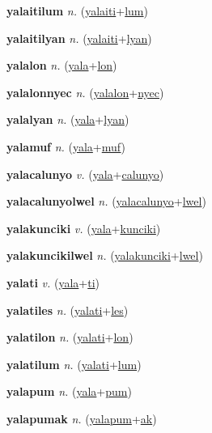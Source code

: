 \textbf{\hypertarget{yalaitilum}{yalaitilum}} \textit{n.} (\hyperlink{yalaiti}{yalaiti}+\allowbreak \hyperlink{lum}{lum})


\textbf{\hypertarget{yalaitilyan}{yalaitilyan}} \textit{n.} (\hyperlink{yalaiti}{yalaiti}+\allowbreak \hyperlink{lyan}{lyan})


\textbf{\hypertarget{yalalon}{yalalon}} \textit{n.} (\hyperlink{yala}{yala}+\allowbreak \hyperlink{lon}{lon})


\textbf{\hypertarget{yalalonnyec}{yalalonnyec}} \textit{n.} (\hyperlink{yalalon}{yalalon}+\allowbreak \hyperlink{nyec}{nyec})


\textbf{\hypertarget{yalalyan}{yalalyan}} \textit{n.} (\hyperlink{yala}{yala}+\allowbreak \hyperlink{lyan}{lyan})


\textbf{\hypertarget{yalamuf}{yalamuf}} \textit{n.} (\hyperlink{yala}{yala}+\allowbreak \hyperlink{muf}{muf})


\textbf{\hypertarget{yalacalunyo}{yalacalunyo}} \textit{v.} (\hyperlink{yala}{yala}+\allowbreak \hyperlink{calunyo}{calunyo})


\textbf{\hypertarget{yalacalunyolwel}{yalacalunyolwel}} \textit{n.} (\hyperlink{yalacalunyo}{yalacalunyo}+\allowbreak \hyperlink{lwel}{lwel})


\textbf{\hypertarget{yalakunciki}{yalakunciki}} \textit{v.} (\hyperlink{yala}{yala}+\allowbreak \hyperlink{kunciki}{kunciki})


\textbf{\hypertarget{yalakuncikilwel}{yalakuncikilwel}} \textit{n.} (\hyperlink{yalakunciki}{yalakunciki}+\allowbreak \hyperlink{lwel}{lwel})


\textbf{\hypertarget{yalati}{yalati}} \textit{v.} (\hyperlink{yala}{yala}+\allowbreak \hyperlink{ti}{ti})


\textbf{\hypertarget{yalatiles}{yalatiles}} \textit{n.} (\hyperlink{yalati}{yalati}+\allowbreak \hyperlink{les}{les})


\textbf{\hypertarget{yalatilon}{yalatilon}} \textit{n.} (\hyperlink{yalati}{yalati}+\allowbreak \hyperlink{lon}{lon})


\textbf{\hypertarget{yalatilum}{yalatilum}} \textit{n.} (\hyperlink{yalati}{yalati}+\allowbreak \hyperlink{lum}{lum})


\textbf{\hypertarget{yalapum}{yalapum}} \textit{n.} (\hyperlink{yala}{yala}+\allowbreak \hyperlink{pum}{pum})


\textbf{\hypertarget{yalapumak}{yalapumak}} \textit{n.} (\hyperlink{yalapum}{yalapum}+\allowbreak \hyperlink{ak}{ak})


